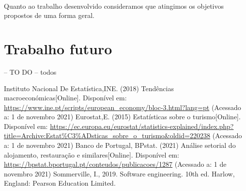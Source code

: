 \documentclass[a4paper,12pt]{scrreprt}
\begin{document}
\paragraph{}
Quanto ao trabalho desenvolvido consideramos que atingimos os objetivos propostos de uma forma geral. 
    
\section{Trabalho futuro}  
-- TO DO -- todos        
        
        
        
        
        







\renewcommand\bibname{Referências}

\begin{thebibliography}{9}

Instituto Nacional De Estatística,INE. (2018) Tendências macroeconómicas[Online]. Disponível em:
\url{https://www.ine.pt/scripts/european\_economy/bloc-3.html?lang=pt} (Acessado a: 1 de novembro 2021)
Eurostat,E. (2015) Estatísticas sobre o turismo[Online]. Disponível em:
\url{https://ec.europa.eu/eurostat/statistics-explained/index.php?title=Archive:Estat\%C3\%ADsticas\_sobre\_o\_turismo&oldid=220238} (Acessado a: 1 de novembro 2021)
Banco de Portugal, BPstat. (2021) Análise setorial do alojamento, restauração e similares[Online]. Disponível em:
\url{https://bpstat.bportugal.pt/conteudos/publicacoes/1287} (Acessado a: 1 de novembro 2021)
Sommerville, I., 2019. Software engineering. 10th ed. Harlow, England: Pearson Education Limited.
\end{thebibliography}
\end{document}
